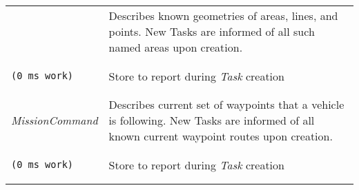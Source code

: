 \begin{longtable}[c]{@{}ll@{}}
\begin{minipage}[t]{0.29\columnwidth}
\strut\end{minipage} &
\begin{minipage}[t]{0.65\columnwidth}\raggedright\strut
Describes known geometries of areas, lines, and points. New Tasks are
informed of all such named areas upon creation.
\strut\end{minipage}\tabularnewline
\begin{minipage}[t]{0.29\columnwidth}\raggedright\strut
\begin{verbatim}
(0 ms work)
\end{verbatim}
\strut\end{minipage} &
\begin{minipage}[t]{0.65\columnwidth}\raggedright\strut
Store to report during \emph{Task} creation
\strut\end{minipage}\tabularnewline
\begin{minipage}[t]{0.29\columnwidth}\raggedright\strut
\emph{MissionCommand}
\strut\end{minipage} &
\begin{minipage}[t]{0.65\columnwidth}\raggedright\strut
Describes current set of waypoints that a vehicle is following. New
Tasks are informed of all known current waypoint routes upon creation.
\strut\end{minipage}\tabularnewline
\begin{minipage}[t]{0.29\columnwidth}\raggedright\strut
\begin{verbatim}
(0 ms work)
\end{verbatim}
\strut\end{minipage} &
\begin{minipage}[t]{0.65\columnwidth}\raggedright\strut
Store to report during \emph{Task} creation
\strut\end{minipage}\tabularnewline
\bottomrule
\end{longtable}

